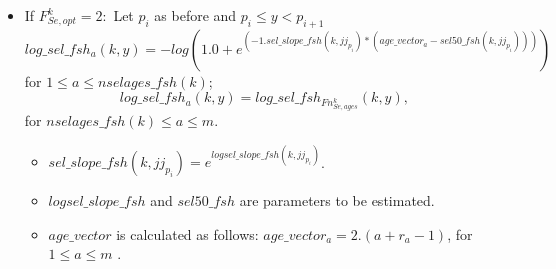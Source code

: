 \documentclass{article}
\begin{document}
\begin{itemize}
    
\item If $F^k_{Se,opt}=2:$ 
Let $p_i$ as before and  $p_i\leq y < p_{i+1}$
\begin{equation}
            log\_sel\_fsh_a(k,y)=-log( 1.0 + e^{(-1.sel\_slope\_fsh(k,jj_{p_i}) * ( age\_vector_a - sel50\_fsh(k,jj_{p_i})) )})
        \end{equation}
        for $1\leq a \leq nselages\_fsh(k)$;
        \begin{equation}
            log\_sel\_fsh_a(k,y)=log\_sel\_fsh_{Fn_{Se,ages}^k}(k,y),
        \end{equation}
        for $nselages\_fsh(k) \leq a \leq m$.
        \begin{itemize}
            \item $sel\_slope\_fsh(k,jj_{p_i}) = e^{logsel\_slope\_fsh(k,jj_{p_i})}$.
            \item $logsel\_slope\_fsh$ and $sel50\_fsh$ are parameters to be estimated.
            \item $age\_vector$ is calculated as follows: $age\_vector_a=2.(a+r_a-1)$, for $1\leq a \leq m$
            .
        \end{itemize}


\end{itemize}
\end{document}
